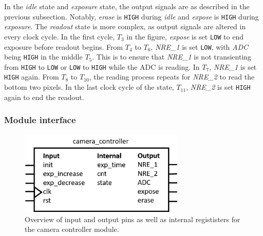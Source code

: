 In the \emph{idle} state and \emph{exposure} state, the output signals are as described in the previous subsection. Notably, \emph{erase} is \verb|HIGH| during \emph{idle} and \emph{expose} is \verb|HIGH| during \emph{exposure}. The \emph{readout} state is more complex, as output signals are altered in every clock cycle. In the first cycle, $T_3$ in the figure, \emph{expose} is set \verb|LOW| to end exposure before readout begins. From $T_4$ to $T_6$, \emph{NRE\_1} is set \verb|LOW|, with \emph{ADC} being \verb|HIGH| in the middle $T_5$. This is to ensure that \emph{NRE\_1} is not transienting from \verb|HIGH| to \verb|LOW| or \verb|LOW| to \verb|HIGH| while the ADC is reading. In $T_7$, \emph{NRE\_1} is set \verb|HIGH| again. From $T_8$ to $T_{10}$, the reading process repeats for \emph{NRE\_2} to read the bottom two pixels. In the last clock cycle of the state, $T_{11}$, \emph{NRE\_2} is set \verb|HIGH| again to end the readout.

\subsubsection{Module interface}

\begin{figure}[H]
    \centering
    \includegraphics[width=0.7\textwidth]{graphs/camera_controller_pinout.png}
    \caption{Overview of input and output pins as well as internal regististers for the camera controller module.}
    \label{fig:io}
\end{figure}
